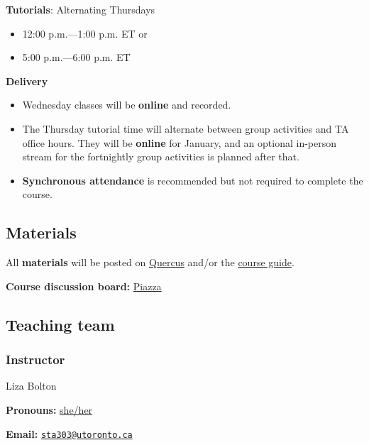 \documentclass[
  openany]{book}
\providecommand{\tightlist}{%
  \setlength{\itemsep}{0pt}\setlength{\parskip}{0pt}}
\begin{document}
\textbf{Tutorials}: Alternating Thursdays

\begin{itemize}
\tightlist
\item
  12:00 p.m.---1:00 p.m. ET or
\item
  5:00 p.m.---6:00 p.m. ET
\end{itemize}

\textbf{Delivery}

\begin{itemize}
\item
  Wednesday classes will be \textbf{online} and recorded.
\item
  The Thursday tutorial time will alternate between group activities and TA office hours. They will be \textbf{online} for January, and an optional in-person stream for the fortnightly group activities is planned after that.
\item
  \textbf{Synchronous attendance} is recommended but not required to complete the course.
\end{itemize}

\hypertarget{materials}{%
\subsection{Materials}\label{materials}}

All \textbf{materials} will be posted on \href{https://q.utoronto.ca/courses/253305}{Quercus} and/or the \href{https://sta303-bolton.github.io/sta303-w22-courseguide/}{course guide}.

\textbf{Course discussion board:} \href{http://piazza.com/utoronto.ca/winter2022/sta303sta1002/home}{Piazza}

\hypertarget{teaching-team}{%
\subsection{Teaching team}\label{teaching-team}}

\hypertarget{instructor}{%
\subsubsection{\texorpdfstring{\textbf{Instructor}}{Instructor}}\label{instructor}}

Liza Bolton

\textbf{Pronouns:} \href{https://www.mypronouns.org/she-her}{she/her}

\textbf{Email:} \href{mailto:sta303@utoronto.ca}{\nolinkurl{sta303@utoronto.ca}}
\end{document}
